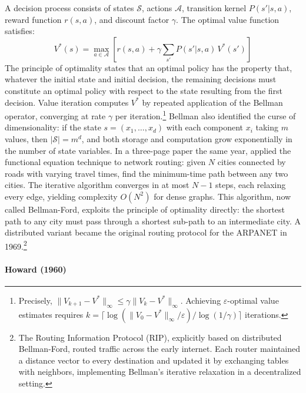 A decision process consists of states $\mathcal{S}$, actions $\mathcal{A}$, transition kernel $P(s'|s,a)$, reward function $r(s,a)$, and discount factor $\gamma$. The optimal value function satisfies:
\begin{equation}
V^*(s) = \max_{a \in \mathcal{A}} \left[ r(s,a) + \gamma \sum_{s'} P(s'|s,a) \, V^*(s') \right]
\label{eq:bellman}
\end{equation}
The principle of optimality states that an optimal policy has the property that, whatever the initial state and initial decision, the remaining decisions must constitute an optimal policy with respect to the state resulting from the first decision. Value iteration computes $V^*$ by repeated application of the Bellman operator, converging at rate $\gamma$ per iteration.\footnote{Precisely, $\|V_{k+1} - V^*\|_\infty \leq \gamma \|V_k - V^*\|_\infty$. Achieving $\varepsilon$-optimal value estimates requires $k = \lceil \log(\|V_0 - V^*\|_\infty / \varepsilon) / \log(1/\gamma) \rceil$ iterations.} Bellman also identified the curse of dimensionality: if the state $s = (x_1, \ldots, x_d)$ with each component $x_i$ taking $m$ values, then $|\mathcal{S}| = m^d$, and both storage and computation grow exponentially in the number of state variables. In a three-page paper the same year, \citet{Bellman1958routing} applied the functional equation technique to network routing: given $N$ cities connected by roads with varying travel times, find the minimum-time path between any two cities. The iterative algorithm converges in at most $N - 1$ steps, each relaxing every edge, yielding complexity $O(N^2)$ for dense graphs. This algorithm, now called Bellman-Ford, exploits the principle of optimality directly: the shortest path to any city must pass through a shortest sub-path to an intermediate city. A distributed variant became the original routing protocol for the ARPANET in 1969.\footnote{The Routing Information Protocol (RIP), explicitly based on distributed Bellman-Ford, routed traffic across the early internet. Each router maintained a distance vector to every destination and updated it by exchanging tables with neighbors, implementing Bellman's iterative relaxation in a decentralized setting.}

\paragraph{Howard (1960)}

